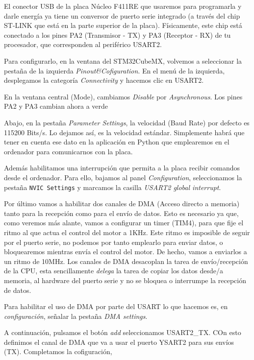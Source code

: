 El conector USB de la placa Núcleo F411RE que usaremos para programarla y darle energía ya tiene un conversor de puerto serie integrado (a través del chip ST-LINK que está en la parte superior de la placa). Físicamente, este chip está conectado a los pines PA2 (Transmisor - TX) y PA3 (Receptor - RX) de tu procesador, que corresponden al periférico USART2.

Para configurarlo, en la ventana del STM32CubeMX, volvemos a seleccionar la pestaña de la izquierda \emph{Pinout\&Cofiguration}. En el menú de la izquierda, desplegamos la categoría \emph{Connectivity} y hacemos clic en USART2.

En la ventana central (Mode), cambiamos \emph{Disable} por \emph{Asynchronous}. Los pines PA2 y PA3 cambian ahora a verde

Abajo, en la pestaña \emph{Parameter Settings}, la velocidad (Baud Rate) por defecto es 115200 Bits/s. Lo dejamos así, es la velocidad estándar. Simplemente habrá que tener en cuenta ese dato en la aplicación en Python que emplearemos en el ordenador para comunicarnos con la placa.

Además habilitamos una interrupción que permita a la placa recibir comandos desde el ordenador. Para ello, bajamos al panel \emph{Configuration}, seleccionamos la pestaña \texttt{NVIC Settings} y marcamos la casilla \emph{USART2 global interrupt}.

Por último vamos a habilitar dos canales de DMA (Acceso directo a memoria) tanto para la recepción como para el envío de datos. Esto es necesario ya que, como veremos más alante, vamos a configurar un timer (TIM4), para que fije  el ritmo al que actua el control del motor a 1KHz. Este ritmo es imposible de seguir por el puerto serie, no podemos por tanto emplearlo para enviar datos, o bloquearemos mientras envía el control del motor. De hecho, vamos a enviarlos a un ritmo de 10MHz. Los canales de DMA desacoplan la tarea de envío/recepción de la CPU, esta sencillamente \emph{delega} la tarea de copiar los datos desde/a memoria, al hardware del puerto serie y no se bloquea o interrumpe la recepción de datos.

Para habilitar el uso de DMA por parte del USART lo que hacemos es, en \emph{configuración}, señalar la pestaña \emph{DMA settings}. 

A continuación, pulsamos el botón \emph{add} seleccionamos USART2\_TX. COn esto definimos el canal de DMA que va a usar el puerto YSART2 para sus envíos (TX). Completamos la cofiguración,

